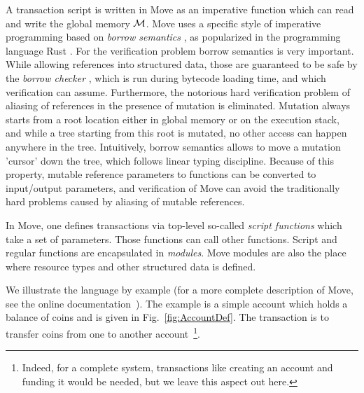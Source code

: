 A transaction script is written in Move as an imperative function which can read
and write the global memory $\mathcal{M}$. Move uses a specific style of
imperative programming based on \emph{borrow semantics} \cite{BORROW_SEM}, as
popularized in the programming language Rust \cite{RUST,RUST_TYPES}. For the
verification problem borrow semantics is very important.  While allowing
references into structured data, those are guaranteed to be safe by the
\emph{borrow checker} \cite{BORROW_CHECKER}, which is run during bytecode
loading time, and which verification can assume. Furthermore, the notorious hard
verification problem of aliasing of references in the presence of mutation is
eliminated.  Mutation always starts from a root location either in global memory
or on the execution stack, and while a tree starting from this root is mutated,
no other access can happen anywhere in the tree. Intuitively, borrow semantics
allows to move a mutation 'cursor' down the tree, which follows linear typing
discipline. Because of this property, mutable reference parameters to functions
can be converted to input/output parameters, and verification of Move can avoid
the traditionally hard problems caused by aliasing of mutable references.



In Move, one defines transactions via top-level so-called \emph{script
  functions} which take a set of parameters.  Those functions can call other
functions. Script and regular functions are encapsulated in \emph{modules}. Move
modules are also the place where resource types and other structured data is
defined.


We illustrate the language by example (for a more complete description of Move,
see the online documentation~\cite{MOVE_LANG_DEF}). The example is a simple
account which holds a balance of coins and is given in
Fig.~\ref{fig:AccountDef}. The transaction is to transfer coins from one to
another account~\footnote{Indeed, for a complete system, transactions like
  creating an account and funding it would be needed, but we leave this aspect
  out here.}.


